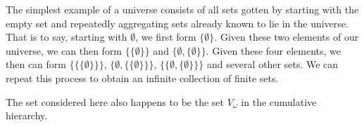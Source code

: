 \documentclass[12pt]{article}
\begin{document}
The simplest example of a universe consists of all sets gotten by starting with the empty set and repeatedly aggregating sets already known to lie in the universe.  That is to say, starting with $\emptyset$, we first form $\{\emptyset\}$.  Given these two elements of our universe, we can then form 
$\{\{\emptyset\}\}$ and $\{\emptyset,\{\emptyset\}\}$.  Given these four elements,
we then can form $\{\{\{\emptyset\}\}\}$, $\{\emptyset,\{\{\emptyset\}\}\}$, 
$\{\{\emptyset,\{\emptyset\}\}\}$ and several other sets.  We can repeat this process to obtain an infinite collection of finite sets. 

The set considered here also happens to be the set $V_\omega$ in the cumulative hierarchy.
\end{document}
